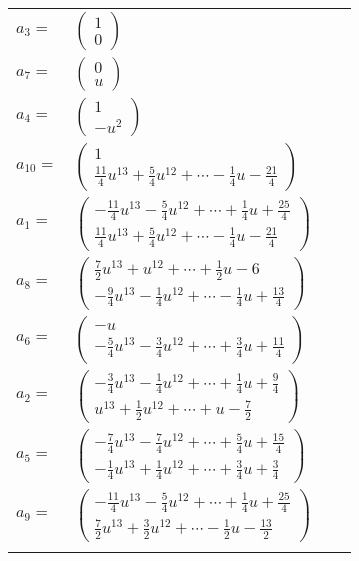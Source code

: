 \documentclass[1p]{elsarticle_modified}
\theoremstyle{definition}
\begin{document}
\begin{tabular}{m{7pt} m{180pt} m{7pt} m{180pt} }
\flushright $a_{3}=$&$\begin{pmatrix}1\\0\end{pmatrix}$ \\
\flushright $a_{7}=$&$\begin{pmatrix}0\\u\end{pmatrix}$ \\
\flushright $a_{4}=$&$\begin{pmatrix}1\\- u^2\end{pmatrix}$ \\
\flushright $a_{10}=$&$\begin{pmatrix}1\\\frac{11}{4} u^{13}+\frac{5}{4} u^{12}+\cdots-\frac{1}{4} u-\frac{21}{4}\end{pmatrix}$ \\
\flushright $a_{1}=$&$\begin{pmatrix}-\frac{11}{4} u^{13}-\frac{5}{4} u^{12}+\cdots+\frac{1}{4} u+\frac{25}{4}\\\frac{11}{4} u^{13}+\frac{5}{4} u^{12}+\cdots-\frac{1}{4} u-\frac{21}{4}\end{pmatrix}$ \\
\flushright $a_{8}=$&$\begin{pmatrix}\frac{7}{2} u^{13}+u^{12}+\cdots+\frac{1}{2} u-6\\-\frac{9}{4} u^{13}-\frac{1}{4} u^{12}+\cdots-\frac{1}{4} u+\frac{13}{4}\end{pmatrix}$ \\
\flushright $a_{6}=$&$\begin{pmatrix}- u\\-\frac{5}{4} u^{13}-\frac{3}{4} u^{12}+\cdots+\frac{3}{4} u+\frac{11}{4}\end{pmatrix}$ \\
\flushright $a_{2}=$&$\begin{pmatrix}-\frac{3}{4} u^{13}-\frac{1}{4} u^{12}+\cdots+\frac{1}{4} u+\frac{9}{4}\\u^{13}+\frac{1}{2} u^{12}+\cdots+u-\frac{7}{2}\end{pmatrix}$ \\
\flushright $a_{5}=$&$\begin{pmatrix}-\frac{7}{4} u^{13}-\frac{7}{4} u^{12}+\cdots+\frac{5}{4} u+\frac{15}{4}\\-\frac{1}{4} u^{13}+\frac{1}{4} u^{12}+\cdots+\frac{3}{4} u+\frac{3}{4}\end{pmatrix}$ \\
\flushright $a_{9}=$&$\begin{pmatrix}-\frac{11}{4} u^{13}-\frac{5}{4} u^{12}+\cdots+\frac{1}{4} u+\frac{25}{4}\\\frac{7}{2} u^{13}+\frac{3}{2} u^{12}+\cdots-\frac{1}{2} u-\frac{13}{2}\end{pmatrix}$\\&\end{tabular}
\end{document}
